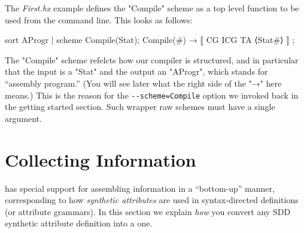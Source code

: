 \documentclass[11pt]{article} %
\begin{document}
\begin{example}
  The \emph{First.hx} example defines the "Compile" scheme as a top level function to be used from
  the command line. This looks as follows:
\begin{hacs}[xleftmargin=\parindent,numbers=right]
sort AProgr | scheme Compile(Stat);
Compile(#) → ⟦ CG ICG TA ⟨Stat#⟩ ⟧ ;
\end{hacs}
  The "Compile" scheme refelcts how our compiler is structured, and in particular that the input is
  a "Stat" and the output an "AProgr", which stands for ``assembly program.''
  (You will see later what the right side of the "→" here means.)  This is the reason for the
  \verb|--scheme=Compile| option we invoked back in the getting started section.  Such wrapper raw
  schemes must have a single argument.
\end{example}


\section{Collecting Information}
\label{sec:collect}

\HAX has special support for assembling information in a ``bottom-up'' manner, corresponding to how
\emph{synthetic attributes} are used in syntax-directed definitions (or attribute grammars).  In
this section we explain \emph{how} you convert any SDD synthetic attribute definition into a \HAX
one.
\end{document}
